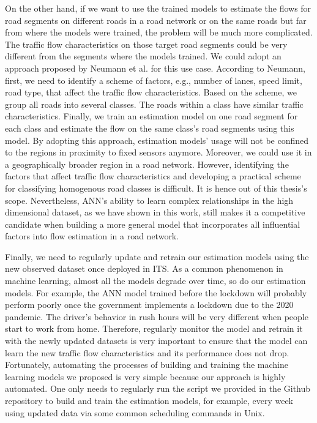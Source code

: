 \documentclass[english]{kththesis}
\begin{document}
On the other hand, if we want to use the trained models to estimate the flows for road segments on different roads in a road network or on the same roads but far from where the models were trained, the problem will be much more complicated. The traffic flow characteristics on those target road segments could be very different from the segments where the models trained. We could adopt an approach proposed by Neumann et al. \cite{neumann_bayesian} for this use case. According to Neumann, first, we need to identify a scheme of factors, e.g., number of lanes, speed limit, road type, that affect the traffic flow characteristics. Based on the scheme, we group all roads into several classes. The roads within a class have similar traffic characteristics. Finally, we train an estimation model on one road segment for each class and estimate the flow on the same class's road segments using this model. By adopting this approach, estimation models' usage will not be confined to the regions in proximity to fixed sensors anymore.
Moreover, we could use it in a geographically broader region in a road network. However, identifying the factors that affect traffic flow characteristics and developing a practical scheme for classifying homogenous road classes is difficult. It is hence out of this thesis's scope. Nevertheless, ANN's ability to learn complex relationships in the high dimensional dataset, as we have shown in this work, still makes it a competitive candidate when building a more general model that incorporates all influential factors into flow estimation in a road network.

Finally, we need to regularly update and retrain our estimation models using the new observed dataset once deployed in ITS. As a common phenomenon in machine learning, almost all the models degrade over time, so do our estimation models. For example, the ANN model trained before the lockdown will probably perform poorly once the government implements a lockdown due to the 2020 pandemic. The driver's behavior in rush hours will be very different when people start to work from home. Therefore, regularly monitor the model and retrain it with the newly updated datasets is very important to ensure that the model can learn the new traffic flow characteristics and its performance does not drop. Fortunately, automating the processes of building and training the machine learning models we proposed is very simple because our approach is highly automated. One only needs to regularly run the script we provided in the Github repository to build and train the estimation models, for example, every week using updated data via some common scheduling commands in Unix.
\end{document}
